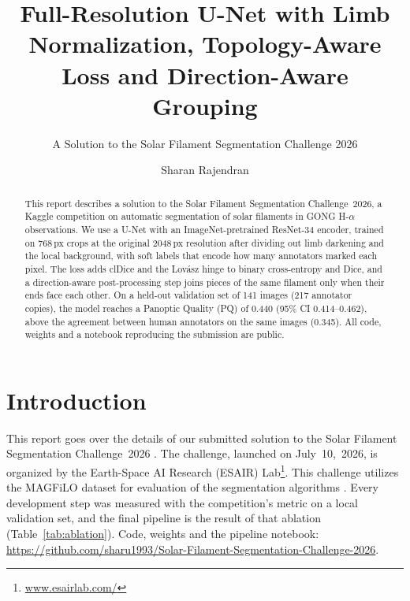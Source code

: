 \documentclass[sigconf]{acmart}
\begin{document}
\title{Full-Resolution U-Net with Limb Normalization, Topology-Aware Loss and Direction-Aware Grouping}  %
\subtitle{A Solution to the Solar Filament Segmentation Challenge 2026} %


\author{Sharan Rajendran}

\begin{abstract}
    This report describes a solution to the Solar Filament Segmentation Challenge~2026, a Kaggle competition on automatic segmentation of solar filaments in GONG H-$\alpha$ observations. We use a U-Net with an ImageNet-pretrained ResNet-34 encoder, trained on 768\,px crops at the original 2048\,px resolution after dividing out limb darkening and the local background, with soft labels that encode how many annotators marked each pixel. The loss adds clDice and the Lovász hinge to binary cross-entropy and Dice, and a direction-aware post-processing step joins pieces of the same filament only when their ends face each other. On a held-out validation set of 141 images (217 annotator copies), the model reaches a Panoptic Quality (PQ) of 0.440 (95\% CI 0.414--0.462), above the agreement between human annotators on the same images (0.345). All code, weights and a notebook reproducing the submission are public.
\end{abstract}

\maketitle


\section{Introduction}
    This report goes over the details of our submitted solution to the Solar Filament Segmentation Challenge~2026 \cite{filament-segmentation-2026}. The challenge, launched on July~10,~2026, is organized by the Earth-Space AI Research (ESAIR) Lab\footnote{\href{https://www.esairlab.com/home}{www.esairlab.com/}}. This challenge utilizes the MAGFiLO dataset for evaluation of the segmentation algorithms \cite{ahmadzadeh2024dataset}. Every development step was measured with the competition's metric on a local validation set, and the final pipeline is the result of that ablation (Table~\ref{tab:ablation}). Code, weights and the pipeline notebook: \url{https://github.com/sharu1993/Solar-Filament-Segmentation-Challenge-2026}.
\end{document}
